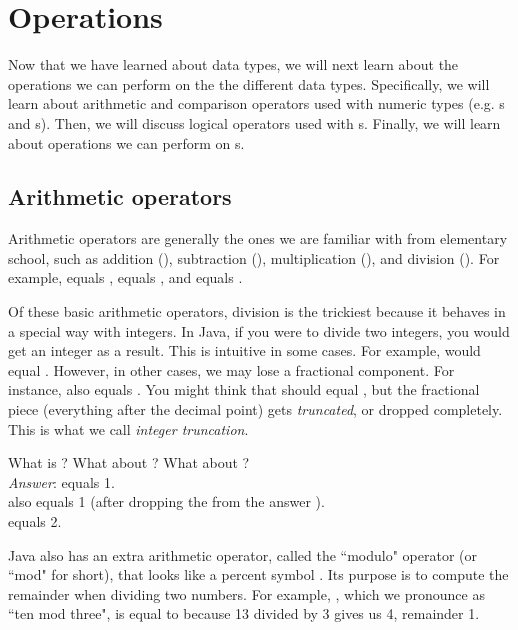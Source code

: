 \section{Operations}
Now that we have learned about data types, we will next learn about the operations we can perform on the the different data types. Specifically, we will learn about arithmetic and comparison operators used with numeric types (e.g. s and s). Then, we will discuss logical operators used with s. Finally, we will learn about operations we can perform on s.

\subsection{Arithmetic operators}
Arithmetic operators are generally the ones we are familiar with from elementary school, such as addition (\ic{+}), subtraction (\ic{-}), multiplication (\ic{*}), and division (\ic{/}). For example,  equals ,  equals , and  equals .

Of these basic arithmetic operators, division is the trickiest because it behaves in a special way with integers. In Java, if you were to divide two integers, you would get an integer as a result. This is intuitive in some cases. For example,  would equal . However, in other cases, we may lose a fractional component. For instance,  also equals . You might think that  should equal , but the fractional piece (everything after the decimal point) gets \emph{truncated}, or dropped completely. This is what we call \emph{integer truncation}.

\begin{example}
What is ? What about ? What about ? \\

\noindent \emph{Answer}:  equals {1}. \\
 also equals {1} (after dropping the  from the answer ). \\
 equals {2}.
\end{example} 

Java also has an extra arithmetic operator, called the ``modulo" operator (or ``mod" for short), that looks like a percent symbol \ic{\%}. Its purpose is to compute the remainder when dividing two numbers. For example, , which we pronounce as ``ten mod three", is equal to  because 13 divided by 3 gives us 4, remainder 1. 

